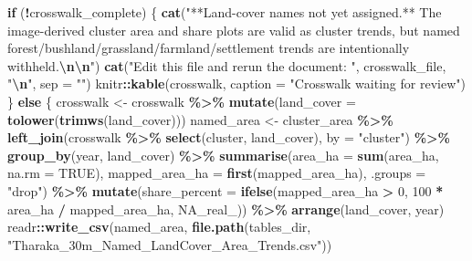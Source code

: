 \documentclass[
]{article}
\newenvironment{Shaded}{\begin{snugshade}}{\end{snugshade}}
\newcommand{\AttributeTok}[1]{\textcolor[rgb]{0.13,0.29,0.53}{#1}}
\newcommand{\ConstantTok}[1]{\textcolor[rgb]{0.56,0.35,0.01}{#1}}
\newcommand{\ControlFlowTok}[1]{\textcolor[rgb]{0.13,0.29,0.53}{\textbf{#1}}}
\newcommand{\DecValTok}[1]{\textcolor[rgb]{0.00,0.00,0.81}{#1}}
\newcommand{\FunctionTok}[1]{\textcolor[rgb]{0.13,0.29,0.53}{\textbf{#1}}}
\newcommand{\NormalTok}[1]{#1}
\newcommand{\OtherTok}[1]{\textcolor[rgb]{0.56,0.35,0.01}{#1}}
\newcommand{\SpecialCharTok}[1]{\textcolor[rgb]{0.81,0.36,0.00}{\textbf{#1}}}
\newcommand{\StringTok}[1]{\textcolor[rgb]{0.31,0.60,0.02}{#1}}
\begin{document}
\begin{Shaded}
\begin{Highlighting}[]
\ControlFlowTok{if}\NormalTok{ (}\SpecialCharTok{!}\NormalTok{crosswalk\_complete) \{}
  \FunctionTok{cat}\NormalTok{(}\StringTok{"**Land{-}cover names not yet assigned.** The image{-}derived cluster area and share plots are valid as cluster trends, but named forest/bushland/grassland/farmland/settlement trends are intentionally withheld.}\SpecialCharTok{\textbackslash{}n\textbackslash{}n}\StringTok{"}\NormalTok{)}
  \FunctionTok{cat}\NormalTok{(}\StringTok{"Edit this file and rerun the document: \textasciigrave{}"}\NormalTok{, crosswalk\_file, }\StringTok{"\textasciigrave{}}\SpecialCharTok{\textbackslash{}n}\StringTok{"}\NormalTok{, }\AttributeTok{sep =} \StringTok{""}\NormalTok{)}
\NormalTok{  knitr}\SpecialCharTok{::}\FunctionTok{kable}\NormalTok{(crosswalk, }\AttributeTok{caption =} \StringTok{"Crosswalk waiting for review"}\NormalTok{)}
\NormalTok{\} }\ControlFlowTok{else}\NormalTok{ \{}
\NormalTok{  crosswalk }\OtherTok{\textless{}{-}}\NormalTok{ crosswalk }\SpecialCharTok{\%\textgreater{}\%} \FunctionTok{mutate}\NormalTok{(}\AttributeTok{land\_cover =} \FunctionTok{tolower}\NormalTok{(}\FunctionTok{trimws}\NormalTok{(land\_cover)))}
\NormalTok{  named\_area }\OtherTok{\textless{}{-}}\NormalTok{ cluster\_area }\SpecialCharTok{\%\textgreater{}\%} \FunctionTok{left\_join}\NormalTok{(crosswalk }\SpecialCharTok{\%\textgreater{}\%} \FunctionTok{select}\NormalTok{(cluster, land\_cover), }\AttributeTok{by =} \StringTok{"cluster"}\NormalTok{) }\SpecialCharTok{\%\textgreater{}\%}
    \FunctionTok{group\_by}\NormalTok{(year, land\_cover) }\SpecialCharTok{\%\textgreater{}\%}
    \FunctionTok{summarise}\NormalTok{(}\AttributeTok{area\_ha =} \FunctionTok{sum}\NormalTok{(area\_ha, }\AttributeTok{na.rm =} \ConstantTok{TRUE}\NormalTok{), }\AttributeTok{mapped\_area\_ha =} \FunctionTok{first}\NormalTok{(mapped\_area\_ha), }\AttributeTok{.groups =} \StringTok{"drop"}\NormalTok{) }\SpecialCharTok{\%\textgreater{}\%}
    \FunctionTok{mutate}\NormalTok{(}\AttributeTok{share\_percent =} \FunctionTok{ifelse}\NormalTok{(mapped\_area\_ha }\SpecialCharTok{\textgreater{}} \DecValTok{0}\NormalTok{, }\DecValTok{100} \SpecialCharTok{*}\NormalTok{ area\_ha }\SpecialCharTok{/}\NormalTok{ mapped\_area\_ha, }\ConstantTok{NA\_real\_}\NormalTok{)) }\SpecialCharTok{\%\textgreater{}\%} \FunctionTok{arrange}\NormalTok{(land\_cover, year)}
\NormalTok{  readr}\SpecialCharTok{::}\FunctionTok{write\_csv}\NormalTok{(named\_area, }\FunctionTok{file.path}\NormalTok{(tables\_dir, }\StringTok{"Tharaka\_30m\_Named\_LandCover\_Area\_Trends.csv"}\NormalTok{))}


\end{Highlighting}
\end{Shaded}
\end{document}
